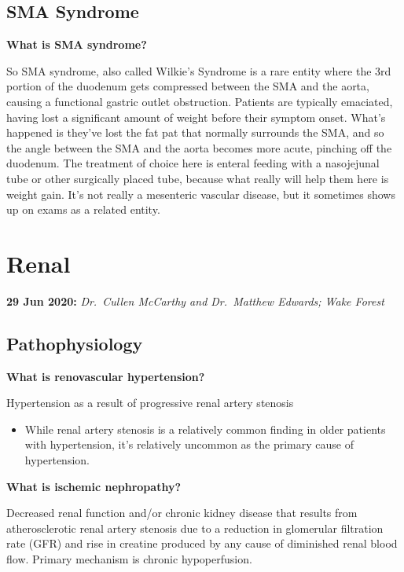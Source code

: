 \documentclass[
]{book}
\providecommand{\tightlist}{%
  \setlength{\itemsep}{0pt}\setlength{\parskip}{0pt}}
\begin{document}
\hypertarget{sma-syndrome}{%
\section{SMA Syndrome}\label{sma-syndrome}}

\textbf{What is SMA syndrome?}

So SMA syndrome, also called Wilkie's Syndrome is a rare entity where
the 3rd portion of the duodenum gets compressed between the SMA and the
aorta, causing a functional gastric outlet obstruction. Patients are
typically emaciated, having lost a significant amount of weight before
their symptom onset. What's happened is they've lost the fat pat that
normally surrounds the SMA, and so the angle between the SMA and the
aorta becomes more acute, pinching off the duodenum. The treatment of
choice here is enteral feeding with a nasojejunal tube or other
surgically placed tube, because what really will help them here is
weight gain. It's not really a mesenteric vascular disease, but it
sometimes shows up on exams as a related entity.

\hypertarget{renal}{%
\chapter{Renal}\label{renal}}

\textbf{29 Jun 2020:} \emph{Dr.~Cullen McCarthy and Dr.~Matthew Edwards; Wake
Forest}

\hypertarget{pathophysiology-1}{%
\section{Pathophysiology}\label{pathophysiology-1}}

\textbf{What is renovascular hypertension?}

Hypertension as a result of progressive renal artery stenosis

\begin{itemize}
\tightlist
\item
  While renal artery stenosis is a relatively common finding in older
  patients with hypertension, it's relatively uncommon as the primary
  cause of hypertension.
\end{itemize}

\textbf{What is ischemic nephropathy?}

Decreased renal function and/or chronic kidney disease that results from
atherosclerotic renal artery stenosis due to a reduction in glomerular
filtration rate (GFR) and rise in creatine produced by any cause of
diminished renal blood flow. Primary mechanism is chronic hypoperfusion.
\citep{rickey125RenovascularDisease2019}
\end{document}
